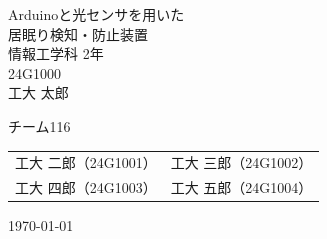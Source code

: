 \documentclass[uplatex,dvipdfmx]{jlreq}
\begin{document}
\begin{titlepage}
\vspace*{2cm}
\centering
\Huge\textsf{Arduinoと光センサを用いた\\居眠り検知・防止装置}\\[2cm]
\Large\textsf{情報工学科 2年}\\
\Large\textsf{24G1000}\\[5pt]
\huge\textsf{工大 太郎}

\vspace*{1cm}
\Large\sffamily
\begin{itembox}[c]{チーム116}
\centering
\begin{tabular}{ll}
工大 二郎（24G1001）&
工大 三郎（24G1002）\\
工大 四郎（24G1003）&
工大 五郎（24G1004）\\
\end{tabular}
\end{itembox}

\vspace*{2cm}
\Large\textsf{\today}
\end{titlepage}
\clearpage








\appendix

\end{document}
